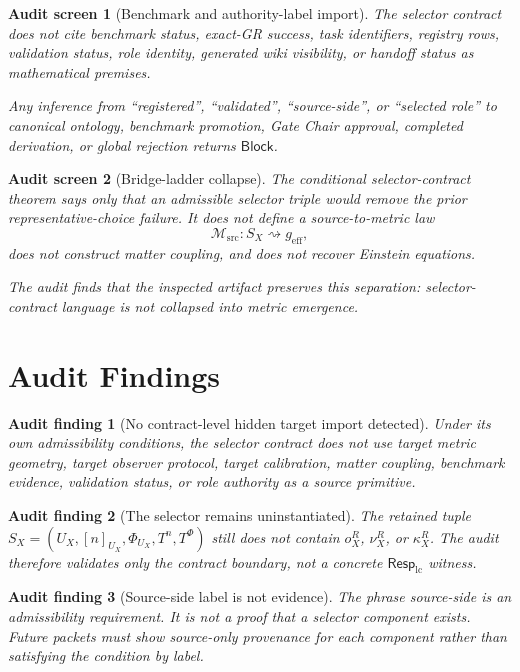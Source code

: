 \documentclass[11pt]{article}
\newcommand{\Msrc}{\mathcal{M}_{\mathrm{src}}}
\newcommand{\RespLC}{\mathsf{Resp}_{\mathrm{lc}}}
\newcommand{\geff}{g_{\mathrm{eff}}}
\newcommand{\Block}{\mathsf{Block}}
\newtheorem{screen}{Audit screen}
\newtheorem{auditfinding}{Audit finding}
\begin{document}
\begin{screen}[Benchmark and authority-label import]
The selector contract does not cite benchmark status, exact-GR
success, task identifiers, registry rows, validation status, role
identity, generated wiki visibility, or handoff status as mathematical
premises.

Any inference from ``registered'', ``validated'', ``source-side'', or
``selected role'' to canonical ontology, benchmark promotion, Gate
Chair approval, completed derivation, or global rejection returns
\(\Block\).
\end{screen}

\begin{screen}[Bridge-ladder collapse]
The conditional selector-contract theorem says only that an
admissible selector triple would remove the prior representative-choice
failure. It does not define a source-to-metric law
\[
    \Msrc: S_X \rightsquigarrow \geff,
\]
does not construct matter coupling, and does not recover Einstein
equations.

The audit finds that the inspected artifact preserves this separation:
selector-contract language is not collapsed into metric emergence.
\end{screen}

\section{Audit Findings}

\begin{auditfinding}[No contract-level hidden target import detected]
Under its own admissibility conditions, the selector contract does not
use target metric geometry, target observer protocol, target
calibration, matter coupling, benchmark evidence, validation status,
or role authority as a source primitive.
\end{auditfinding}

\begin{auditfinding}[The selector remains uninstantiated]
The retained tuple \(S_X=(U_X,[n]_{U_X},\Phi_{U_X},T^n,T^\Phi)\) still
does not contain \(o^R_X\), \(\nu^R_X\), or \(\kappa^R_X\). The audit
therefore validates only the contract boundary, not a concrete
\(\RespLC\) witness.
\end{auditfinding}

\begin{auditfinding}[Source-side label is not evidence]
The phrase source-side is an admissibility requirement. It is not a
proof that a selector component exists. Future packets must show
source-only provenance for each component rather than satisfying the
condition by label.
\end{auditfinding}
\end{document}
